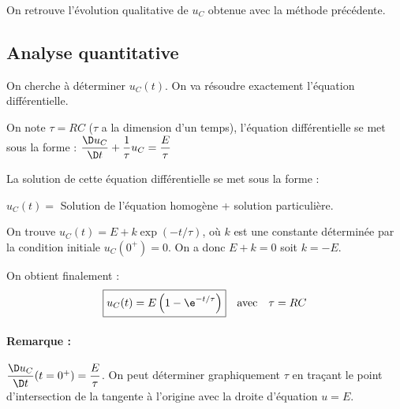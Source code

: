 \documentclass{cours}
\begin{document}
On retrouve l'évolution qualitative de $u_C$ obtenue avec la méthode précédente.
\subsection{Analyse quantitative}

On cherche à déterminer $u_C(t)$. On va résoudre exactement l'équation différentielle.

On note $\tau=RC$ ($\tau$ a la dimension d'un temps), l'équation différentielle se met sous la forme : $\dfrac{\D u_C}{\D t}+\dfrac{1}{\tau}u_C=\dfrac{E}{\tau}$

La solution de cette équation différentielle se met sous la forme :
\begin{center}
$u_C(t)= $ Solution de l'équation homogène + solution particulière.
\end{center}
On trouve $u_C(t)=E+k\exp(-t/\tau)$, où $k$ est une constante déterminée par la condition initiale $u_C(0^+)=0$. On a donc $E+k=0$ soit $k=-E$.

On obtient finalement :
\begin{equation*}
\boxed{
u_C(t)=E \left( 1-\e^{-t/\tau} \right)
} \quad \text{avec} \quad \tau=RC
\end{equation*}

\noindent\begin{minipage}{7cm}
\end{minipage}%
\begin{minipage}{\linewidth-7cm}
\paragraph{Remarque :} $\dfrac{\D u_C}{\D t}(t=0^+)=\dfrac{E}{\tau}$. On peut déterminer graphiquement $\tau$ en traçant le point d'intersection de la tangente à l'origine avec la droite d'équation $u=E$.
\end{minipage}
\end{document}
